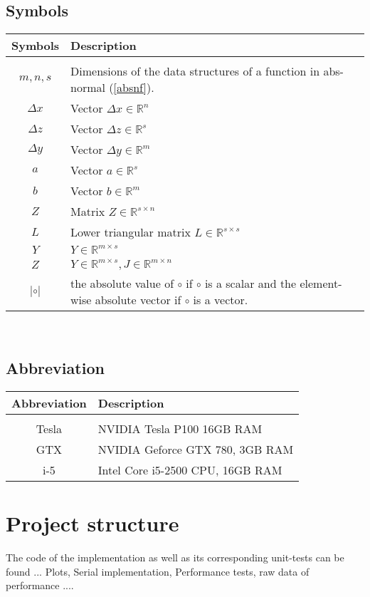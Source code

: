 \subsection{Symbols}
\begin{tabular}{c|l}
	Symbols & Description \\
	\hline \\
	 $m,n,s$ & Dimensions of the data structures of a function in abs-normal (\ref{absnf}). \\
	 $\Delta x$ & Vector $\Delta x \in \mathbb{R}^n$ \\
	 $\Delta z$ & Vector $\Delta z \in \mathbb{R}^s$ \\
	 $\Delta y$ & Vector $\Delta y \in \mathbb{R}^m$ \\
	 $a$		& Vector $a \in \mathbb{R}^s$ \\
	 $b$		& Vector $b \in \mathbb{R}^{m}$ \\
	 $Z$		& Matrix $Z \in \mathbb{R}^{s\times n}$ \\
	 $L$	    & Lower triangular matrix $L \in \mathbb{R}^{s \times s}$ \\
	 $Y$		& $Y \in \mathbb{R}^{m \times s}$ \\
	 $Z$		& $Y \in \mathbb{R}^{m \times s}, J \in \mathbb{R}^{m \times n}$ \\
	 $|\circ|$  & the absolute value of $\circ$ if $\circ$ is a scalar and the element-wise absolute vector if $\circ$ is a vector.
\end{tabular} \\

\subsection{Abbreviation}
\begin{tabular}{c|l}
	Abbreviation & Description \\
	\hline \\
	Tesla & NVIDIA Tesla P100 16GB RAM \\
	GTX & NVIDIA Geforce GTX 780, 3GB RAM \\
	i-5 & Intel Core i5-2500 CPU, 16GB RAM
\end{tabular}

\section{Project structure} \label{sec_project}
The code of the implementation as well as its corresponding unit-tests can be found ...
Plots, Serial implementation, Performance tests, raw data of performance ....